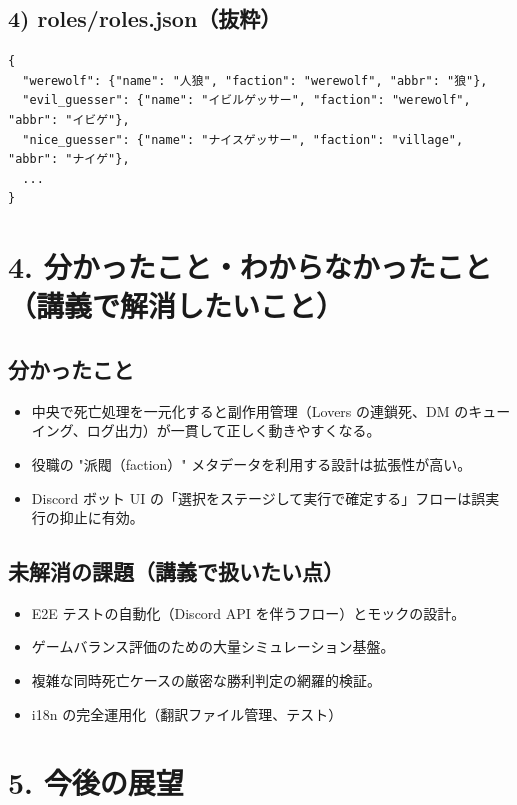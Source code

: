 \documentclass[12pt,a4paper]{article}
\begin{document}
\subsection*{4) roles/roles.json（抜粋）}
\begin{verbatim}
{
  "werewolf": {"name": "人狼", "faction": "werewolf", "abbr": "狼"},
  "evil_guesser": {"name": "イビルゲッサー", "faction": "werewolf", "abbr": "イビゲ"},
  "nice_guesser": {"name": "ナイスゲッサー", "faction": "village", "abbr": "ナイゲ"},
  ...
}
\end{verbatim}

\section*{4. 分かったこと・わからなかったこと（講義で解消したいこと）}

\subsection*{分かったこと}
\begin{itemize}
  \item 中央で死亡処理を一元化すると副作用管理（Lovers の連鎖死、DM のキューイング、ログ出力）が一貫して正しく動きやすくなる。
  \item 役職の "派閥（faction）" メタデータを利用する設計は拡張性が高い。
  \item Discord ボット UI の「選択をステージして実行で確定する」フローは誤実行の抑止に有効。
\end{itemize}

\subsection*{未解消の課題（講義で扱いたい点）}
\begin{itemize}
  \item E2E テストの自動化（Discord API を伴うフロー）とモックの設計。
  \item ゲームバランス評価のための大量シミュレーション基盤。
  \item 複雑な同時死亡ケースの厳密な勝利判定の網羅的検証。
  \item i18n の完全運用化（翻訳ファイル管理、テスト）
\end{itemize}

\section*{5. 今後の展望}
\end{document}
